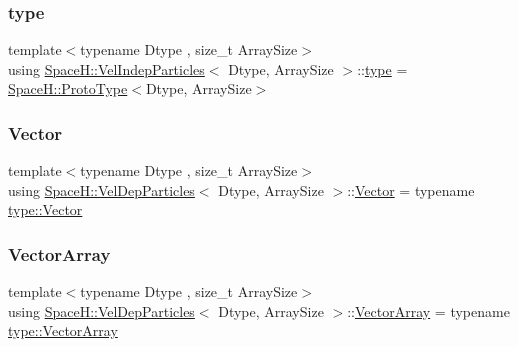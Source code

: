 \mbox{\label{class_space_h_1_1_vel_dep_particles_a09aa167b5fb1b203ab021220601ed74c}} 
\subsubsection{\texorpdfstring{type}{type}}
{\footnotesize\ttfamily template$<$typename Dtype , size\+\_\+t Array\+Size$>$ \\
using \mbox{\hyperlink{class_space_h_1_1_vel_indep_particles}{Space\+H\+::\+Vel\+Indep\+Particles}}$<$ Dtype, Array\+Size $>$\+::\mbox{\hyperlink{class_space_h_1_1_vel_indep_particles_a09aa167b5fb1b203ab021220601ed74c}{type}} =  \mbox{\hyperlink{struct_space_h_1_1_proto_type}{Space\+H\+::\+Proto\+Type}}$<$Dtype, Array\+Size$>$}

\mbox{\label{class_space_h_1_1_vel_dep_particles_a1533a108b1dfc2197e0cc5ae56972e51}} 
\subsubsection{\texorpdfstring{Vector}{Vector}}
{\footnotesize\ttfamily template$<$typename Dtype , size\+\_\+t Array\+Size$>$ \\
using \mbox{\hyperlink{class_space_h_1_1_vel_dep_particles}{Space\+H\+::\+Vel\+Dep\+Particles}}$<$ Dtype, Array\+Size $>$\+::\mbox{\hyperlink{class_space_h_1_1_vel_indep_particles_a61bbcfdb0dc7f99f3c68af69a755c935}{Vector}} =  typename \mbox{\hyperlink{struct_space_h_1_1_proto_type_a316b81f4660b2b4fab14a8e1f23b6089}{type\+::\+Vector}}}

\mbox{\label{class_space_h_1_1_vel_dep_particles_afabe6c07ec68aec77523491650dfc50d}} 
\subsubsection{\texorpdfstring{Vector\+Array}{VectorArray}}
{\footnotesize\ttfamily template$<$typename Dtype , size\+\_\+t Array\+Size$>$ \\
using \mbox{\hyperlink{class_space_h_1_1_vel_dep_particles}{Space\+H\+::\+Vel\+Dep\+Particles}}$<$ Dtype, Array\+Size $>$\+::\mbox{\hyperlink{class_space_h_1_1_vel_indep_particles_aa9983058940249df8b00fa800e8cbad2}{Vector\+Array}} =  typename \mbox{\hyperlink{struct_space_h_1_1_proto_type_a622b8e122b33bb4966a02299fb7b82d6}{type\+::\+Vector\+Array}}}



